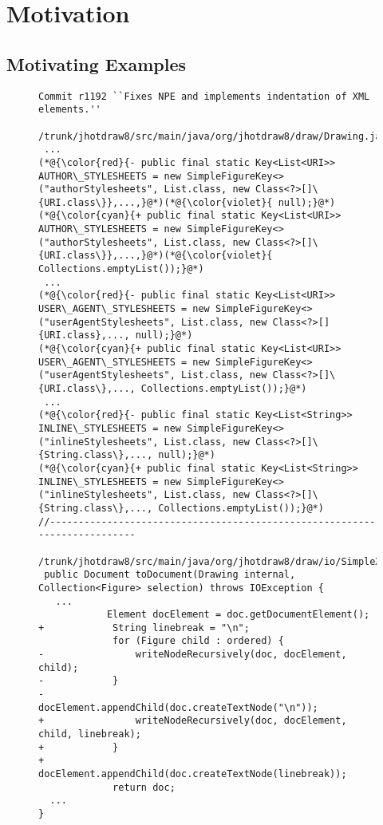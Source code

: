 \section{Motivation}
\label{motiv:sec}

\subsection{Motivating Examples}
\label{exe:sec}

\begin{figure}[t]
	\centering
	\begin{lstlisting}[]
Commit r1192 ``Fixes NPE and implements indentation of XML elements.''
 /trunk/jhotdraw8/src/main/java/org/jhotdraw8/draw/Drawing.java
 ...
(*@{\color{red}{- public final static Key<List<URI>> AUTHOR\_STYLESHEETS = new SimpleFigureKey<> ("authorStylesheets", List.class, new Class<?>[]\{URI.class\}},...,}@*)(*@{\color{violet}{ null);}@*)
(*@{\color{cyan}{+ public final static Key<List<URI>> AUTHOR\_STYLESHEETS = new SimpleFigureKey<> ("authorStylesheets", List.class, new Class<?>[]\{URI.class\}},...,}@*)(*@{\color{violet}{ Collections.emptyList());}@*)
 ...
(*@{\color{red}{- public final static Key<List<URI>> USER\_AGENT\_STYLESHEETS = new SimpleFigureKey<>("userAgentStylesheets", List.class, new Class<?>[]{URI.class},..., null);}@*)
(*@{\color{cyan}{+ public final static Key<List<URI>> USER\_AGENT\_STYLESHEETS = new SimpleFigureKey<> ("userAgentStylesheets", List.class, new Class<?>[]\{URI.class\},..., Collections.emptyList());}@*)
 ...
(*@{\color{red}{- public final static Key<List<String>> INLINE\_STYLESHEETS = new SimpleFigureKey<> ("inlineStylesheets", List.class, new Class<?>[]\{String.class\},..., null);}@*)
(*@{\color{cyan}{+ public final static Key<List<String>> INLINE\_STYLESHEETS = new SimpleFigureKey<> ("inlineStylesheets", List.class, new Class<?>[]\{String.class\},..., Collections.emptyList());}@*)
//--------------------------------------------------------------------------
 /trunk/jhotdraw8/src/main/java/org/jhotdraw8/draw/io/SimpleXmlIO.java
 public Document toDocument(Drawing internal, Collection<Figure> selection) throws IOException {
   ...
            Element docElement = doc.getDocumentElement();
+            String linebreak = "\n";
             for (Figure child : ordered) {
-                writeNodeRecursively(doc, docElement, child);
-            }
-            docElement.appendChild(doc.createTextNode("\n"));
+                writeNodeRecursively(doc, docElement, child, linebreak);
+            }
+            docElement.appendChild(doc.createTextNode(linebreak));
             return doc;
  ...
}
  

\end{lstlisting}
\end{figure}
